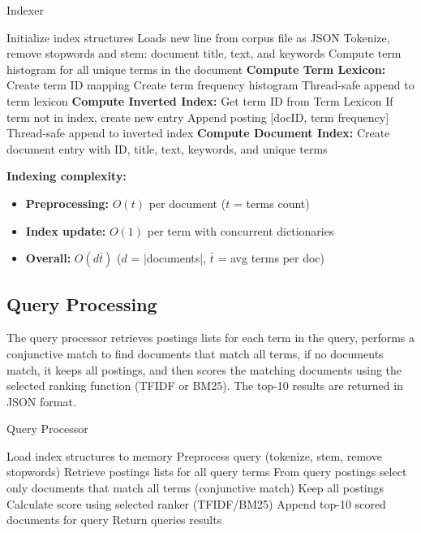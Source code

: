 \begin{algorithm}[H]
  \caption{Indexer}
  \begin{algorithmic}
    \STATE Initialize index structures
    \STATE Loads new line from corpus file as JSON
    \STATE Tokenize, remove stopwords and stem: document title, text, and keywords
    \STATE Compute term histogram for all unique terms in the document
    \STATE \textbf{Compute Term Lexicon:}
    \STATE \quad Create term ID mapping
    \STATE \quad Create term frequency histogram
    \STATE \quad Thread-safe append to term lexicon
    \STATE \textbf{Compute Inverted Index:}
    \quad {}
    \STATE \qquad Get term ID from Term Lexicon
    \STATE \qquad If term not in index, create new entry
    \STATE \qquad Append posting [docID, term frequency]
    \STATE \qquad Thread-safe append to inverted index
    \ENDFOR
    \STATE \textbf{Compute Document Index:}
    \STATE \quad Create document entry with ID, title, text, keywords, and unique terms
    \ENDFOR
  \end{algorithmic}
\end{algorithm}

\textbf{Indexing complexity:}

\begin{itemize}
  \item \textbf{Preprocessing:} $O(t)$ per document ($t$ = terms count)
  \item \textbf{Index update:} $O(1)$ per term with concurrent dictionaries
  \item \textbf{Overall:} $O(d \bar{t})$ ($d$ = |documents|, $\bar{t}$ = avg terms per doc)
\end{itemize}

\subsection{Query Processing} \label{subsec:query-processing}

The query processor retrieves postings lists for each term in the query, performs a conjunctive match to find documents that match all terms, if no documents match, it keeps all postings, and then scores the matching documents using the selected ranking function (TFIDF or BM25). The top-10 results are returned in JSON format.

\begin{algorithm}[H]
  \caption{Query Processor}
  \begin{algorithmic}
    \STATE Load index structures to memory
    \STATE Preprocess query (tokenize, stem, remove stopwords)
    \STATE Retrieve postings lists for all query terms
    \STATE From query postings select only documents that match all terms (conjunctive match)
    \STATE Keep all postings
    \ENDIF
    \STATE Calculate score using selected ranker (TFIDF/BM25)
    \ENDFOR
    \STATE Append top-10 scored documents for query
    \ENDFOR
    \STATE Return queries results
  \end{algorithmic}
\end{algorithm}

